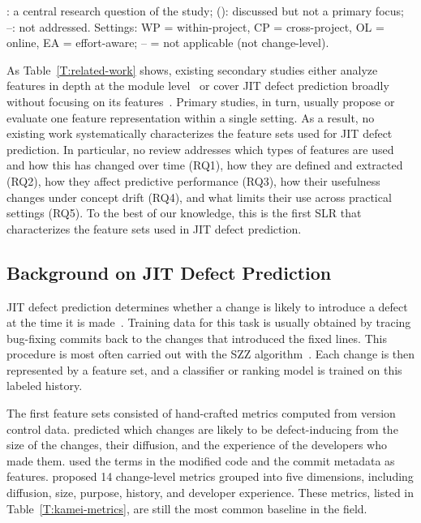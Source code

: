 \documentclass[sigconf,review]{acmart}
\begin{document}
\begin{table}[t]
    \vspace{3pt}
    \parbox{0.9\textwidth}{\raggedright\footnotesize
        \checkmark: a central research question of the study; (\checkmark): discussed but not a primary focus; --: not addressed.
        Settings: WP = within-project, CP = cross-project, OL = online, EA = effort-aware; -- = not applicable (not change-level).}
\end{table}

As Table~\ref{T:related-work} shows, existing secondary studies either analyze features in depth at the module level~\cite{radjenovic2013software, qiu2025survey} or cover JIT defect prediction broadly without focusing on its features~\cite{zhao2023systematic, alnagi2024just}. Primary studies, in turn, usually propose or evaluate one feature representation within a single setting. As a result, no existing work systematically characterizes the feature sets used for JIT defect prediction. In particular, no review addresses which types of features are used and how this has changed over time (RQ1), how they are defined and extracted (RQ2), how they affect predictive performance (RQ3), how their usefulness changes under concept drift (RQ4), and what limits their use across practical settings (RQ5). To the best of our knowledge, this is the first SLR that characterizes the feature sets used in JIT defect prediction.

\subsection{Background on JIT Defect Prediction}
\label{SS:rw-background}

JIT defect prediction determines whether a change is likely to introduce a defect at the time it is made~\cite{mockus2000predicting, kim2008classifying, kamei2013large}. Training data for this task is usually obtained by tracing bug-fixing commits back to the changes that introduced the fixed lines. This procedure is most often carried out with the SZZ algorithm~\cite{sliwerski2005changes}. Each change is then represented by a feature set, and a classifier or ranking model is trained on this labeled history.

The first feature sets consisted of hand-crafted metrics computed from version control data. \citet{mockus2000predicting} predicted which changes are likely to be defect-inducing from the size of the changes, their diffusion, and the experience of the developers who made them. \citet{kim2008classifying} used the terms in the modified code and the commit metadata as features. \citet{kamei2013large} proposed 14 change-level metrics grouped into five dimensions, including diffusion, size, purpose, history, and developer experience. These metrics, listed in Table~\ref{T:kamei-metrics}, are still the most common baseline in the field.
\end{document}
